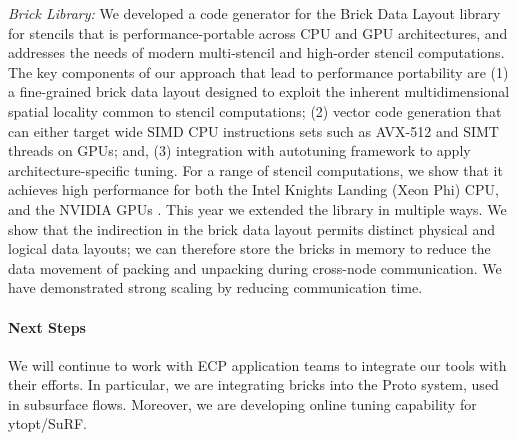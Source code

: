 \vspace*{.1in}
\noindent
\textit{Brick Library:}
We developed a code generator for the Brick Data Layout library for stencils
that is performance-portable across CPU and GPU architectures, and addresses the
needs of modern multi-stencil and high-order stencil computations. The key
components of our approach that lead to performance portability are (1) a
fine-grained brick data layout designed to exploit the inherent multidimensional
spatial locality common to stencil computations; (2) vector code generation that
can either target wide SIMD CPU instructions sets such as AVX-512 and SIMT
threads on GPUs; and, (3) integration with autotuning framework to apply
architecture-specific tuning. For a range of stencil computations, we show that
it achieves high performance for both the Intel Knights Landing (Xeon Phi) CPU,
and the NVIDIA GPUs \cite{P3HPC_Bricks,zhao2019}. This year we extended the library in multiple ways.
We show that the indirection in the brick data layout permits distinct physical and logical data layouts; we can
therefore store the bricks in memory to reduce the data movement of packing and unpacking during cross-node
communication.  We have demonstrated strong scaling by reducing communication time.  

\paragraph{Next Steps}

We will continue to work with ECP application teams to integrate our tools with their efforts.  In particular,
we are integrating bricks into the Proto system, used in subsurface flows.
Moreover, we are developing online tuning capability for ytopt/SuRF. 
